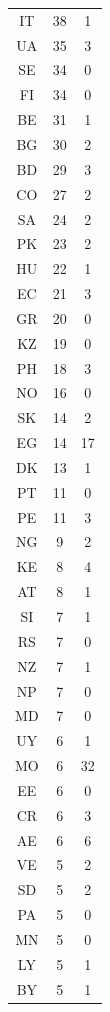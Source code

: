 {\begin{table}[ht]
{{\begin{tabular}{c|cc}
            IT & 38 & 1\\
            UA & 35 & 3\\
            SE & 34 & 0\\
            FI & 34 & 0\\
            BE & 31 & 1\\
            BG & 30 & 2\\
            BD & 29 & 3\\
            CO & 27 & 2\\
            SA & 24 & 2\\
            PK & 23 & 2\\
            HU & 22 & 1\\
            EC & 21 & 3\\
            GR & 20 & 0\\
            KZ & 19 & 0\\
            PH & 18 & 3\\
            NO & 16 & 0\\
            SK & 14 & 2\\
            EG & 14 & 17\\
            DK & 13 & 1\\
            PT & 11 & 0\\
            PE & 11 & 3\\
            NG & 9 & 2\\
            KE & 8 & 4\\
            AT & 8 & 1\\
            SI & 7 & 1\\
            RS & 7 & 0\\
            NZ & 7 & 1\\
            NP & 7 & 0\\
            MD & 7 & 0\\
            UY & 6 & 1\\
            MO & 6 & 32\\
            EE & 6 & 0\\
            CR & 6 & 3\\
            AE & 6 & 6\\
            VE & 5 & 2\\
            SD & 5 & 2\\
            PA & 5 & 0\\
            MN & 5 & 0\\
            LY & 5 & 1\\
            BY & 5 & 1\\

\end{tabular}}}
\end{table}}
